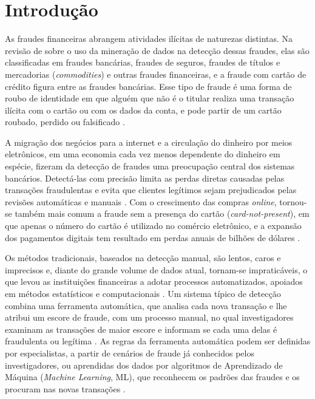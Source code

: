 \documentclass{uflamon}          %
\begin{document}
\clearpage

\pagestyle{ufla}


\chapter{Introdução}
\label{cap:introducao}

As fraudes financeiras abrangem atividades ilícitas de naturezas distintas. Na revisão de  sobre o uso da mineração de dados na detecção dessas fraudes, elas são classificadas em fraudes bancárias, fraudes de seguros, fraudes de títulos e mercadorias (\textit{commodities}) e outras fraudes financeiras, e a fraude com cartão de crédito figura entre as fraudes bancárias. Esse tipo de fraude é uma forma de roubo de identidade em que alguém que não é o titular realiza uma transação ilícita com o cartão ou com os dados da conta, e pode partir de um cartão roubado, perdido ou falsificado \cite{alarfaj2022}.

A migração dos negócios para a internet e a circulação do dinheiro por meios eletrônicos, em uma economia cada vez menos dependente do dinheiro em espécie, fizeram da detecção de fraudes uma preocupação central dos sistemas bancários. Detectá-las com precisão limita as perdas diretas causadas pelas transações fraudulentas e evita que clientes legítimos sejam prejudicados pelas revisões automáticas e manuais \cite{jurgovsky2018}. Com o crescimento das compras \textit{online}, tornou-se também mais comum a fraude sem a presença do cartão (\textit{card-not-present}), em que apenas o número do cartão é utilizado no comércio eletrônico, e a expansão dos pagamentos digitais tem resultado em perdas anuais de bilhões de dólares \cite{alarfaj2022}.

Os métodos tradicionais, baseados na detecção manual, são lentos, caros e imprecisos e, diante do grande volume de dados atual, tornam-se impraticáveis, o que levou as instituições financeiras a adotar processos automatizados, apoiados em métodos estatísticos e computacionais \cite{west2016}. Um sistema típico de detecção combina uma ferramenta automática, que analisa cada nova transação e lhe atribui um escore de fraude, com um processo manual, no qual investigadores examinam as transações de maior escore e informam se cada uma delas é fraudulenta ou legítima \cite{jurgovsky2018}. As regras da ferramenta automática podem ser definidas por especialistas, a partir de cenários de fraude já conhecidos pelos investigadores, ou aprendidas dos dados por algoritmos de Aprendizado de Máquina (\textit{Machine Learning}, ML), que reconhecem os padrões das fraudes e os procuram nas novas transações \cite{jurgovsky2018}.
\end{document}
